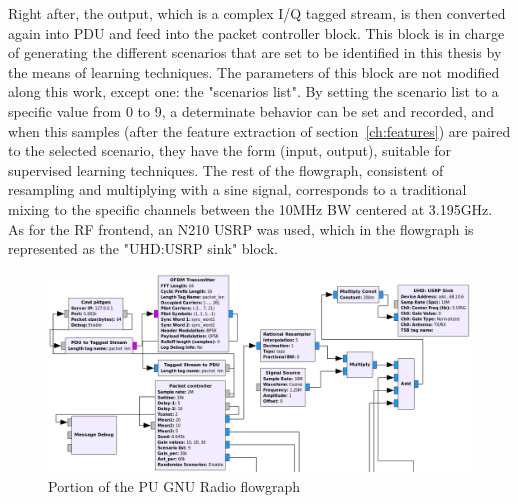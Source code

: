 Right after, the output, which is a complex I/Q tagged stream, is then converted again into \ac{PDU} and feed into the packet controller block. This block is in charge of generating the different scenarios that are set to be identified in this thesis by the means of learning techniques. The parameters of this block are not modified along this work, except one: the "scenarios list". By setting the scenario list to a specific value from 0 to 9, a determinate behavior can be set and recorded, and when this samples (after the feature extraction of section~\ref{ch:features}) are paired to the selected scenario, they have the form (input, output), suitable for supervised learning techniques. The rest of the flowgraph, consistent of resampling and multiplying with a sine signal, corresponds to a traditional mixing to the specific channels between the 10MHz \ac{BW} centered at 3.195GHz. As for the \ac{RF} frontend, an N210 \ac{USRP} was used, which in the flowgraph is represented as the "UHD:USRP sink" block.

\begin{figure}[!htb]
    \centering
    \includegraphics[width=\textwidth]{figures/PU_flowgraph}
    \caption{Portion of the \ac{PU} GNU Radio flowgraph}
    \label{fig:PU_flowgraph}
\end{figure}

